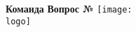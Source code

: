 





% 
    
    \noindent
    \textbf{Команда \theteams} \hfill \textbf{Вопрос №}
    \vfill
    \hspace{1mm}\texttt{[image: \\logo]}
    \newline \newline \newline
    
% 
